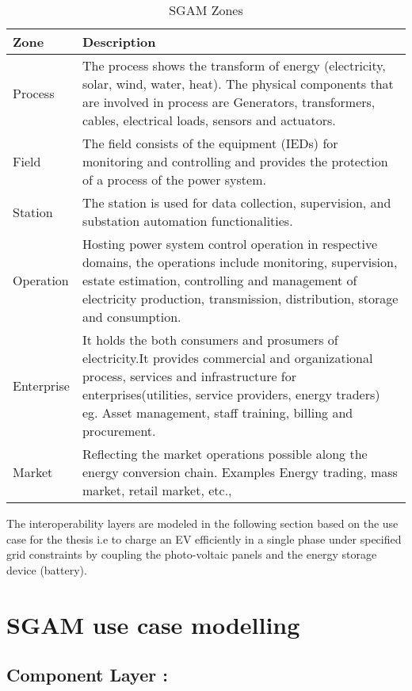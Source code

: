 \documentclass{article}
\begin{document}
\begin{table}[h!b]
	\centering
	\begin{tabular} { | l | p{14cm} | }
		\hline
		\textbf{Zone} & \textbf{Description} \\ 
		\hline
		Process & The process shows the transform of energy (electricity, solar, wind, water,
		heat). The physical components that are involved in process are Generators,
		transformers, cables, electrical loads, sensors and actuators. \\ 
		\hline
		Field & The field consists of the equipment (IEDs) for monitoring and controlling and
		provides the protection of a process of the power system. \\ 
		\hline
		Station & The station is used for data collection, supervision, and substation
		automation functionalities.\\ 
		\hline
		Operation & Hosting power system control operation in respective domains, the
		operations include monitoring, supervision, estate estimation, controlling and
		management of electricity production, transmission, distribution, storage and
		consumption. \\ 
		\hline
		Enterprise & It holds the both consumers and prosumers of electricity.It provides commercial and organizational process, services and
		infrastructure for enterprises(utilities, service providers, energy traders) eg.
		Asset management, staff training, billing and procurement. \\
		\hline
		Market & Reflecting the market operations possible along the energy conversion
		chain. Examples Energy trading, mass market, retail market, etc.,\\ 
		\hline
	\end{tabular}
	\caption{SGAM Zones}
	\label{table:3} 
\end{table}
\clearpage
The interoperability layers are modeled in the following section based on the use case for the thesis i.e to charge an EV efficiently in a single phase under specified grid constraints by coupling the
photo-voltaic panels and the energy storage device (battery).

\section{SGAM use case modelling }
\subsection{Component Layer :}
\end{document}
